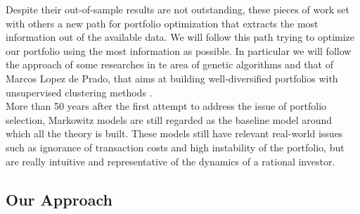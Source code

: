 \documentclass[12pt]{article} %
\numberwithin{equation}{subsection}
\begin{document}
Despite their out-of-sample results are not outstanding, these pieces of work set with others a new path for portfolio optimization that extracts the most information out of the available data. We will follow this path trying to optimize our portfolio using the most information as possible. In particular we will follow the approach of some researches in te area of genetic algorithms \cite{genetic_1} and that of Marcos Lopez de Prado, that aims at building well-diversified portfolios with unsupervised clustering methods \cite{HRP}.\\
More than 50 years after the first attempt to address the issue of portfolio selection, Markowitz models are still regarded as the baseline model around which all the theory is built. These models still have relevant real-world issues such as ignorance of transaction costs and high instability of the portfolio, but are really intuitive and representative of the dynamics of a rational investor.  


\subsection{Our Approach}
\end{document}
